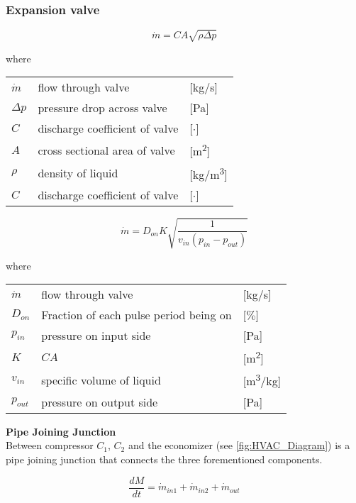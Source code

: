 \subsubsection{Expansion valve}

\begin{equation}
	\dot{m}= C A \sqrt{\rho\Delta p}
\end{equation}

where 
\begin{center}
	\begin{tabular}{l p{8cm} l}
		$\dot{m}$ & flow through valve & [\si{kg}/\si{s}]\\ 
		$\Delta p$ & pressure drop across valve & [\si{Pa}]\\
		$C$ & discharge coefficient of valve & [$\cdot$]\\
		$A$ & cross sectional area of valve & [\si{m^2}]\\
		$\rho$ & density of liquid & [\si{kg}/\si{m^3}]\\
		$C$ & discharge coefficient of valve & [$\cdot$]\\
	\end{tabular}
\end{center}

\begin{equation}
	\dot{m}= D_{on} K  \sqrt{\frac{1}{v_{in} (p_{in} - p_{out})}}
\end{equation}

where 
\begin{center}
	\begin{tabular}{l p{8cm} l}
		$\dot{m}$ & flow through valve & [\si{kg}/\si{s}]\\ 
		$D_{on}$ & Fraction of each pulse period being on & [$\%$]\\
		$p_{in}$ & pressure on input side & [\si{Pa}]\\
		$K$ & $C A$ & [\si{m^2}]\\
		$v_{in}$ & specific volume of liquid & [\si{m^3}/\si{kg}]\\
		$p_{out}$ & pressure on output side & [\si{Pa}]\\
	\end{tabular}
\end{center}

\textbf{Pipe Joining Junction} \\
Between compressor $ C_1 $, $ C_2 $ and the economizer (see \cref{fig:HVAC_Diagram}) is a pipe joining junction that connects the three forementioned components.

\begin{equation} \label{eq:PipeJoiningJunction_ChangeOfMass}
	\frac{dM}{dt} = \dot{m}_{in1} + \dot{m}_{in2} + \dot{m}_{out}
\end{equation}

